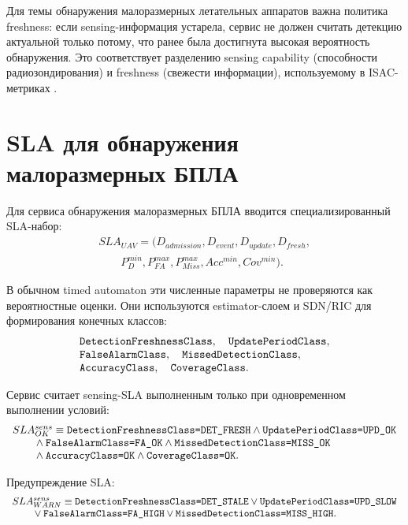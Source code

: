 \documentclass[10pt,a4paper]{article}
\newcommand{\code}[1]{\ifmmode\text{\ttfamily\detokenize{#1}}\else\texttt{\detokenize{#1}}\fi}
\begin{document}
Для темы обнаружения малоразмерных летательных аппаратов важна политика freshness: если sensing-информация устарела, сервис не должен считать детекцию актуальной только потому, что ранее была достигнута высокая вероятность обнаружения. Это соответствует разделению sensing capability (способности радиозондирования) и freshness (свежести информации), используемому в ISAC-метриках \cite{liu_senscap,liu_coop}.

\section{SLA для обнаружения малоразмерных БПЛА}

Для сервиса обнаружения малоразмерных БПЛА вводится специализированный SLA-набор:
\[
\begin{array}{l}
SLA_{UAV}=(D_{admission},D_{event},D_{update},D_{fresh},\\
\qquad P_D^{min},P_{FA}^{max},P_{Miss}^{max},Acc^{min},Cov^{min}).
\end{array}
\]

В обычном timed automaton эти численные параметры не проверяются как вероятностные оценки. Они используются estimator-слоем и SDN/RIC для формирования конечных классов:
\[
\begin{array}{l}
\code{DetectionFreshnessClass},\quad \code{UpdatePeriodClass},\\
\code{FalseAlarmClass},\quad \code{MissedDetectionClass},\\
\code{AccuracyClass},\quad \code{CoverageClass}.
\end{array}
\]

Сервис считает sensing-SLA выполненным только при одновременном выполнении условий:
\[
\begin{array}{l}
SLA^{sens}_{OK}\equiv
\code{DetectionFreshnessClass=DET_FRESH}\land \code{UpdatePeriodClass=UPD_OK}\\
\qquad {}\land \code{FalseAlarmClass=FA_OK}\land
\code{MissedDetectionClass=MISS_OK}\\
\qquad {}\land \code{AccuracyClass=OK}\land
\code{CoverageClass=OK}.
\end{array}
\]

Предупреждение SLA:
\[
\begin{array}{l}
SLA^{sens}_{WARN}\equiv
\code{DetectionFreshnessClass=DET_STALE}\vee \code{UpdatePeriodClass=UPD_SLOW}\\
\qquad {}\vee \code{FalseAlarmClass=FA_HIGH}\vee
\code{MissedDetectionClass=MISS_HIGH}.
\end{array}
\]
\end{document}
